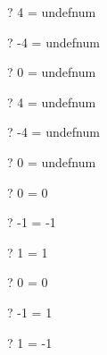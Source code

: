 \documentclass{article}
\newcommand{\negate}{-}
\begin{document}
\begin{zed} \vdash?  4  = undefnum \end{zed}
\begin{zed} \vdash?   \negate 4  = undefnum \end{zed}
\begin{zed} \vdash?   0  = undefnum \end{zed}

\begin{zed} \vdash?   4  = undefnum \end{zed}
\begin{zed} \vdash?   \negate 4  = undefnum \end{zed}
\begin{zed} \vdash?   0  = undefnum \end{zed}

\begin{zed} \vdash?   0  = 0 \end{zed}
\begin{zed} \vdash?   \negate 1  = \negate 1 \end{zed}
\begin{zed} \vdash?   1  = 1 \end{zed}
\begin{zed} \vdash?   0 \div \negate 1 = 0 \end{zed}
\begin{zed} \vdash?   \negate 1 \div \negate 1 = 1 \end{zed}
\begin{zed} \vdash?   1 \div \negate 1 = \negate 1 \end{zed}
\end{document}
